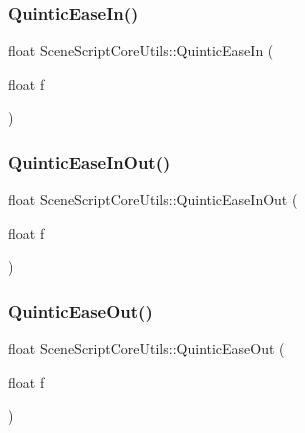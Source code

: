 \hypertarget{class_scene_script_core_utils_aca6a4436737260472795aac82f24e259}{}\label{class_scene_script_core_utils_aca6a4436737260472795aac82f24e259} 
\subsubsection{\texorpdfstring{Quintic\+Ease\+In()}{QuinticEaseIn()}}
{\footnotesize\ttfamily float Scene\+Script\+Core\+Utils\+::\+Quintic\+Ease\+In (\begin{DoxyParamCaption}\item[{float}]{f }\end{DoxyParamCaption})}

\hypertarget{class_scene_script_core_utils_a9c45ec7052f797248fb236327448f10d}{}\label{class_scene_script_core_utils_a9c45ec7052f797248fb236327448f10d} 
\subsubsection{\texorpdfstring{Quintic\+Ease\+In\+Out()}{QuinticEaseInOut()}}
{\footnotesize\ttfamily float Scene\+Script\+Core\+Utils\+::\+Quintic\+Ease\+In\+Out (\begin{DoxyParamCaption}\item[{float}]{f }\end{DoxyParamCaption})}

\hypertarget{class_scene_script_core_utils_a09f96835e68c2c96edb9f87f89b5b140}{}\label{class_scene_script_core_utils_a09f96835e68c2c96edb9f87f89b5b140} 
\subsubsection{\texorpdfstring{Quintic\+Ease\+Out()}{QuinticEaseOut()}}
{\footnotesize\ttfamily float Scene\+Script\+Core\+Utils\+::\+Quintic\+Ease\+Out (\begin{DoxyParamCaption}\item[{float}]{f }\end{DoxyParamCaption})}

